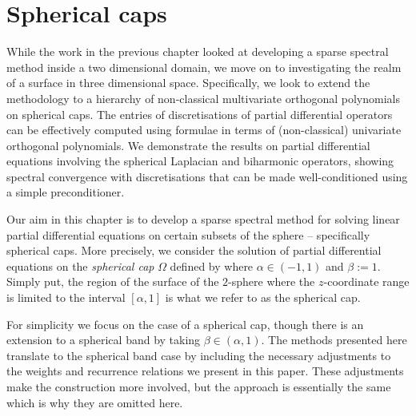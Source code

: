 

\chapter{Spherical caps}\label{CHAPTER:sphericalcaps}

While the work in the previous chapter looked at developing a sparse spectral method inside a two dimensional domain, we move on to investigating the realm of a surface in three dimensional space. Specifically, we look to extend the methodology to a hierarchy of non-classical multivariate orthogonal polynomials on spherical caps. The entries of discretisations of partial differential operators can be effectively computed using formulae in terms of (non-classical) univariate orthogonal polynomials. We demonstrate the results on partial differential equations involving the spherical Laplacian and biharmonic operators, showing spectral convergence with discretisations that can be made well-conditioned using a simple preconditioner. 

Our aim in this chapter is to develop a sparse spectral method for solving linear partial differential equations on certain subsets of the sphere -- specifically spherical caps. More precisely, we consider the solution of partial differential equations on the \textit{spherical cap} $\Omega$ defined by
where $\alpha \in (-1,1)$ and $\beta := 1$. Simply put, the region of the surface of the $2$-sphere where the $z$-coordinate range is limited to the interval $[\alpha,1]$ is what we refer to as the spherical cap.

\remark For simplicity we focus on the case of a spherical cap, though there is an extension to a spherical band by taking $\beta \in (\alpha,1)$. The methods presented here translate to the spherical band case by including the necessary adjustments to the weights and recurrence relations we present in this paper. These adjustments make the construction more involved, but the approach is essentially the same which is why they are omitted here.

